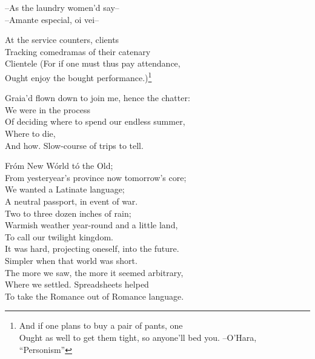 



--As the laundry women'd say-- \\
--Amante especial, oi vei-- 

At the service counters, clients \\
Tracking comedramas of their catenary \\
Clientele (For if one must thus pay attendance, \\ 
Ought enjoy the bought performance.)\footnote{And if one plans to buy a pair of pants, one \\
Ought as well to get them tight, so anyone'll bed you. --O'Hara, ``Personism''}

Graia'd flown down to join me, hence the chatter: \\
We were in the process \\
Of deciding where to spend our endless summer, \\
Where to die, \\
And how. Slow-course of trips to tell.

Fróm New Wórld tó the Old; \\
From yesteryear's province now tomorrow's core; \\
We wanted a Latinate language; \\
A neutral passport, in event of war. \\
Two to three dozen inches of rain; \\
Warmish weather year-round and a little land, \\
To call our twilight kingdom. \\

It was hard, projecting oneself, into the future. \\
Simpler when that world was short. \\
The more we saw, the more it seemed arbitrary, \\
Where we settled. Spreadsheets helped \\ 
To take the Romance out of Romance language.

